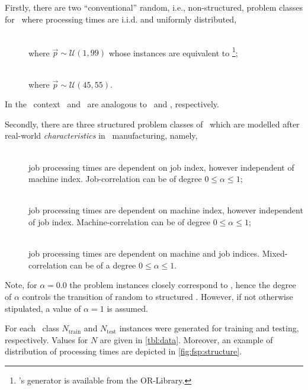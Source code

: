 Firstly, there are two ``conventional'' random, i.e., non-structured, problem classes for \FSP\  where processing times are i.i.d. and uniformly distributed, 
\begin{description}
\item[\Frnd]   \hfill \\
where $\vec{p}\sim\mathcal{U}(1,99)$ whose instances are equivalent to \cite{Taillard1993}\footnote{\citeauthor{Taillard1993}'s generator is available from the OR-Library.};
\item[\Frndn]   \hfill \\
where $\vec{p}\sim\mathcal{U}(45,55)$.
\end{description}
In the \JSP\ context \ and \ are analogous to \ and , respectively.  


Secondly, there are three structured problem classes of \FSP\  which are modelled after real-world \emph{characteristics} in \fsp\ manufacturing, namely, 
\begin{description}
\item[\Fjc]  \hfill \\
job processing times are dependent on job index, however independent of machine index. Job-correlation can be of degree $0\leq\alpha\leq1$;
\item[\Fmc]   \hfill \\
job processing times are dependent on machine index, however independent of job index. Machine-correlation can be of degree $0\leq\alpha\leq1$; 
\item[\Fmxc]   \hfill \\
job processing times are dependent on machine and job indices. Mixed-correlation can be of a degree $0\leq\alpha\leq1$.
\end{description} 
Note, for $\alpha=0.0$ the problem instances closely correspond to , hence the degree of $\alpha$ controls the transition of random to structured \FSP. However, if not otherwise stipulated, a value of $\alpha=1$ is assumed.

For each \FSP\  class $N_{\text{train}}$  and $N_{\text{test}}$ instances were generated for training and testing, respectively. Values for $N$ are given in \cref{tbl:data}. Moreover, an example of distribution of processing times are depicted in \cref{fig:fsp:structure}.


